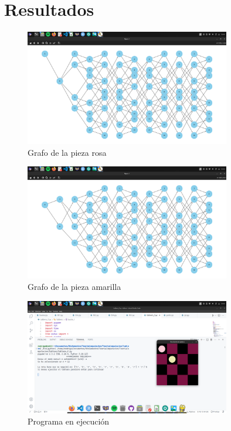 \documentclass[11pt]{article} %
\begin{document}
	\section{Resultados}
	
	
	
	\begin{figure}[h]
		\centering
		\includegraphics[width=0.8\textwidth]{imagen1.png}
		\caption{Grafo de la pieza rosa}
	\end{figure}
	
	\begin{figure}[h]
		\centering
		\includegraphics[width=0.8\textwidth]{imagen2.png}
		\caption{Grafo de la pieza amarilla}
	\end{figure}
	
	\begin{figure}[h]
		\centering
		\includegraphics[width=0.8\textwidth]{imagen4.png}
		\caption{Programa en ejecución}
	\end{figure}
	
\end{document}
